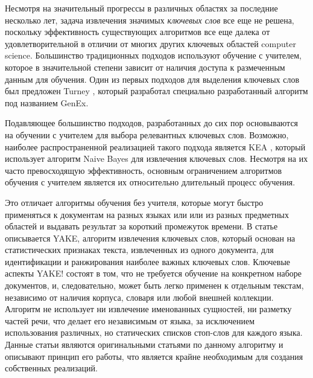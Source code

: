 \documentclass[14pt]{matmex-diploma-custom}
\begin{document}


Несмотря на значительный прогрессы в различных областях за последние несколько лет, задача извлечения значимых \textit{ключевых слов} все еще не решена, поскольку эффективность существующих алгоритмов все еще далека от удовлетворительной в отличии от многих других ключевых областей computer science. Большинство традиционных подходов используют обучение с учителем, которое в значительной степени зависит от наличия доступа к размеченным данным для обучения. Один из первых подходов для выделения ключевых слов был предложен Turney \cite{Turney2000LearningAF}, который разработал специально разработанный алгоритм под названием GenEx.

Подавляющее большинство подходов, разработанных до сих пор основываются на обучении с учителем для выбора релевантных ключевых слов. Возможно, наиболее распространенной реализацией такого подхода является KEA \cite{Witten:1999:KPA:313238.313437}, который использует алгоритм Naive Bayes для извлечения ключевых слов. Несмотря на их часто превосходящую эффективность, основным ограничением алгоритмов обучения с учителем является их относительно длительный процесс обучения.

Это отличает алгоритмы обучения без учителя, которые могут быстро применяться к документам на разных языках или или из разных предметных областей и выдавать результат за короткий промежуток времени. В статье \cite{yake1, yake2} описывается YAKE, алгоритм извлечения ключевых слов, который основан на статистических признаках текста, извлеченных из одного документа, для идентификации и ранжирования наиболее важных ключевых слов. Ключевые аспекты YAKE! состоят в том, что не требуется обучение на конкретном наборе документов, и, следовательно, может быть легко применен к отдельным текстам, независимо от наличия корпуса, словаря или любой внешней коллекции. Алгоритм не использует ни извлечение именованных сущностей, ни разметку частей речи, что делает его независимым от языка, за исключением использования различных, но статических списков стоп-слов для каждого языка. Данные статьи являются оригинальными статьями по данному алгоритму и описывают принцип его работы, что является крайне необходимым для создания собственных реализаций.
\end{document}
